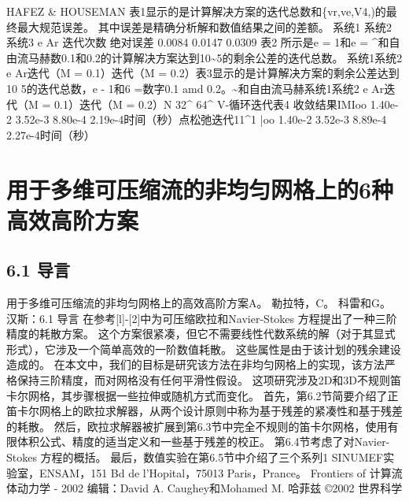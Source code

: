 \documentclass[UTF8,11pt,a4paper,openany,fontset=fandol]{ctexbook}
\begin{document}
HAFEZ \& HOUSEMAN 表1显示的是计算解决方案的迭代总数和\{vr,ve,V4,)的最终最大规范误差。 其中误差是精确分析解和数值结果之间的差额。 系统1 系统2 系统3 e Ar 迭代次数 绝对误差 0.0084 0.0147 0.0309 表2 所示是e = 1和e = \textasciicircum{}和自由流马赫数0.1和0.2的计算解决方案达到10\textasciitilde{}5的剩余公差的迭代总数。 系统1系统2 e Ar迭代（M = 0.1）迭代（M = 0.2）表3显示的是计算解决方案的剩余公差达到10 5的迭代总数，e - 1和6 =数字0.1 amd 0.2。\textasciitilde{}和自由流马赫系统1系统2 e Ar迭代（M = 0.1）迭代（M = 0.2）N 32\textasciicircum{} 64\textasciicircum{} V-循环迭代表4 收敛结果IMIoo 1.40e-2 3.52e-3 8.80e-4 2.19e-4时间（秒）点松弛迭代11\textasciicircum{}1 |oo 1.40e-2 3.52e-3 8.89e-4 2.27e-4时间（秒）

\clearpage
\chapter{用于多维可压缩流的非均匀网格上的6种高效高阶方案}
\section{6.1 导言}
用于多维可压缩流的非均匀网格上的高效高阶方案A。 勒拉特，C。 科雷和G。 汉斯：6.1 导言 在参考[l]-[2]中为可压缩欧拉和Navier-Stokes 方程提出了一种三阶精度的耗散方案。 这个方案很紧凑，但它不需要线性代数系统的解（对于其显式形式），它涉及一个简单高效的一阶数值耗散。 这些属性是由于该计划的残余建设造成的。 在本文中，我们的目标是研究该方法在非均匀网格上的实现，该方法严格保持三阶精度，而对网格没有任何平滑性假设。 这项研究涉及2D和3D不规则笛卡尔网格，其步骤根据一些拉伸或随机方式而变化。 首先，第6.2节简要介绍了正笛卡尔网格上的欧拉求解器，从两个设计原则中称为基于残差的紧凑性和基于残差的耗散。 然后，欧拉求解器被扩展到第6.3节中完全不规则的笛卡尔网格，使用有限体积公式、精度的适当定义和一些基于残差的校正。 第6.4节考虑了对Navier-Stokes 方程的概括。 最后，数值实验在第6.5节中介绍了三个系列1 SINUMEF实验室，ENSAM，151 Bd de l'Hopital，75013 Paris，Prance。 Frontiers of 计算流体动力学 - 2002 编辑：David A. Caughey和Mohamed M. 哈菲兹 ©2002 世界科学
\end{document}
